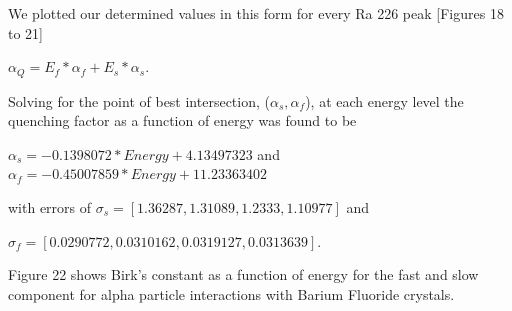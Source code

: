 \documentclass{article}
\begin{document}
\noindent
We plotted our determined values in this form for every Ra 226 peak [Figures 18 to 21]

\noindent
$\alpha_Q = E_f * \alpha_f + E_s * \alpha_s$.

Solving for the point of best intersection, ($\alpha_s, \alpha_f$), at each energy level the quenching factor as a function of energy was found to be 

\noindent
$\alpha_s = -0.1398072 * Energy + 4.13497323$ and $\alpha_f = -0.45007859 * Energy + 11.23363402$ 

\noindent
with errors of 
\noindent
$\sigma_s = [1.36287, 1.31089, 1.2333, 1.10977]$ and 

\noindent
$\sigma_f = [0.0290772, 0.0310162, 0.0319127, 0.0313639]$. 

\noindent
Figure 22 shows Birk's constant as a function of energy for the fast and slow component for alpha particle interactions with Barium Fluoride crystals.
\end{document}
